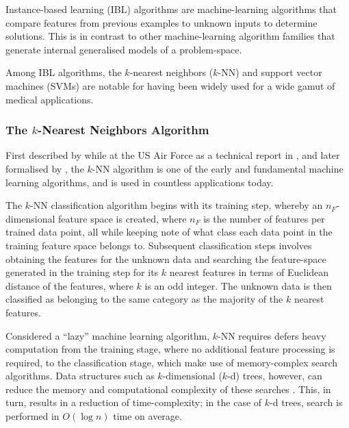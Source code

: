 Instance-based learning (IBL) algorithms are machine-learning algorithms that compare features from previous examples to unknown inputs to determine solutions. This is in contrast to other machine-learning algorithm families that generate internal generalised models of a problem-space.


Among IBL algorithms, the $k$-nearest neighbors ($k$-NN) and support vector machines (SVMs) are notable for having been widely used for a wide gamut of medical applications.

\subsubsection{The $k$-Nearest Neighbors Algorithm}

First described by \citeauthor{fix1951} while at the US Air Force as a technical report in \citeyear{fix1951}, and later formalised by \citeauthor{hart1967}, the $k$-NN algorithm is one of the early and fundamental machine learning algorithms, and is used in countless applications today.

The $k$-NN classification algorithm begins with its training step, whereby an $n_F$-dimensional feature space is created, where $n_F$ is the number of features per trained data point, all while keeping note of what class each data point in the training feature space belongs to. Subsequent classification steps involves obtaining the features for the unknown data and searching the feature-space generated in the training step for its $k$ nearest features in terms of Euclidean distance of the features, where $k$ is an odd integer. The unknown data is then classified as belonging to the same category as the majority of the $k$ nearest features. 

Considered a ``lazy'' machine learning algorithm, $k$-NN requires defers heavy computation from the training stage, where no additional feature processing is required, to the classification stage, which make use of memory-complex search algorithms. Data structures such as $k\textrm{-dimensional}$ ($k$-d) trees, however, can reduce the memory and computational complexity of these searches \citep{otair2013}. This, in turn, results in a reduction of time-complexity; in the case of $k$-d trees, search is performed in $O(\log n)$ time on average.

